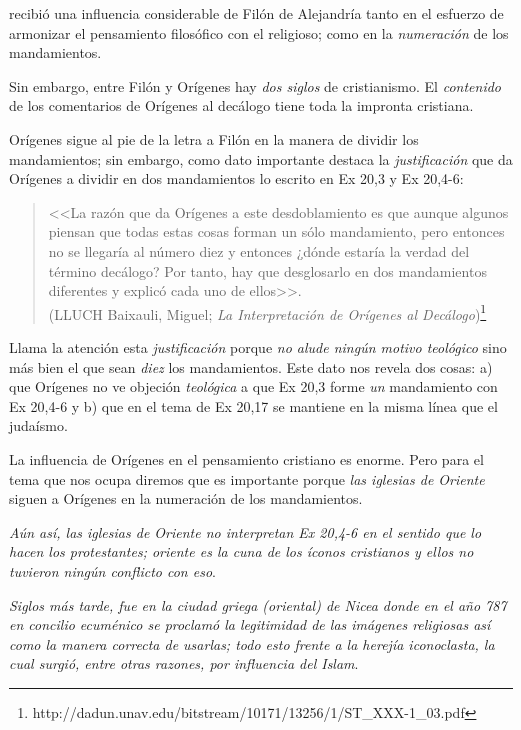\documentclass{article}
\begin{document}
recibi\'o una influencia considerable de Fil\'{o}n de Alejandr\'{i}a tanto en el esfuerzo de armonizar el pensamiento filos\'{o}fico con el religioso; como en la \emph{numeraci\'on} de los mandamientos.

Sin embargo, entre Fil\'on y Or\'{i}genes hay \emph{dos siglos} de cristianismo. El \emph{contenido} de los comentarios de Or\'{i}genes al dec\'alogo tiene toda la impronta cristiana.

Or\'{i}genes sigue al pie de la letra a Fil\'on en la manera de dividir los mandamientos; sin embargo, como dato importante destaca la \emph{justificaci\'on} que da Or\'{i}genes a dividir en dos mandamientos lo escrito en Ex 20,3 y Ex 20,4-6:

\begin{quote}
<<La razón que da Orígenes a este desdoblamiento es que aunque
algunos piensan que todas estas cosas forman un sólo mandamiento, pero
entonces no se llegaría al número diez y entonces ¿dónde estaría la verdad
del término decálogo? Por tanto, hay que desglosarlo en dos mandamientos
diferentes y explicó cada uno de ellos>>.\\
(LLUCH Baixauli, Miguel; \emph{La Interpretación de Orígenes al Decálogo})\footnote{http://dadun.unav.edu/bitstream/10171/13256/1/ST\_XXX-1\_03.pdf}
\end{quote}

\noindent
Llama la atenci\'on esta \emph{justificaci\'on} porque \emph{no alude ning\'un motivo teol\'ogico} sino m\'as bien el que sean \emph{diez} los mandamientos. Este dato nos revela dos cosas: a) que Or\'{i}genes no ve objeci\'on \emph{teol\'ogica} a que Ex 20,3 forme \emph{un} mandamiento con Ex 20,4-6 y b) que en el tema de Ex 20,17 se mantiene en la misma l\'{i}nea que el juda\'{i}smo.

La influencia de Or\'{i}genes en el pensamiento cristiano es enorme. Pero para el tema que nos ocupa diremos que es importante porque \emph{las iglesias de Oriente} siguen a Or\'{i}genes en la numeraci\'on de los mandamientos.

\emph{A\'un as\'{i}, las iglesias de Oriente no interpretan Ex 20,4-6 en el sentido que lo hacen los protestantes; oriente es la cuna de los \'{i}conos cristianos y ellos no tuvieron ning\'un conflicto con eso}. 

\emph{Siglos m\'as tarde, fue en la ciudad griega (oriental) de Nicea donde en el a\~no 787 en concilio ecum\'enico se proclam\'o la legitimidad de las im\'agenes religiosas as\'{i} como la manera correcta de usarlas; todo esto frente a la herej\'{i}a iconoclasta, la cual surgi\'o, entre otras razones, por influencia del Islam}.
\end{document}
